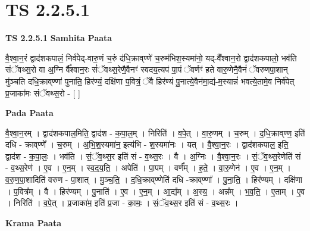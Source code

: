 \documentclass[17pt]{extarticle}
\begin{document}
\section*{ TS 2.2.5.1 }

\textbf{TS 2.2.5.1 } \newline
\textbf{Samhita Paata} \newline

वै॒श्वा॒न॒रं द्वाद॑शकपालं॒ निर्व॑पेद्-वारु॒णं च॒रुं द॑धि॒क्राव्‌ण्णे॑ च॒रुम॑भिश॒स्यमा॑नो॒ यद्-वै᳚श्वान॒रो द्वाद॑शकपालो॒ भव॑ति संॅवथ्स॒रो वा अ॒ग्नि र्वै᳚श्वान॒रः सं॑ॅवथ्स॒रेणै॒वैनꣳ॑ स्वदय॒त्यप॑ पा॒पं ॅवर्णꣳ॑ हते वारु॒णेनै॒वैनं॑ ॅवरुणपा॒शान् मु॑ञ्चति दधि॒क्राव्‌ण्णा॑ पुनाति॒ हिर॑ण्यं॒ दक्षि॑णा प॒वित्रं॒ ॅवै हिर॑ण्यं पु॒नात्ये॒वैन॑मा॒द्य॑-म॒स्यान्नं॑ भवत्ये॒तामे॒व निर्व॑पेत् प्र॒जाका॑मः संॅवथ्स॒रो - [  ] \newline

\textbf{Pada Paata} \newline

वै॒श्वा॒न॒रम् । द्वाद॑शकपाल॒मिति॒ द्वाद॑श - क॒पा॒ल॒म् । निरिति॑ । व॒पे॒त् । वा॒रु॒णम् । च॒रुम् । द॒धि॒क्राव्‌ण्ण॒ इति॑ दधि - क्राव्‌ण्णे᳚ । च॒रुम् । अ॒भि॒श॒स्यमा॑न॒ इत्य॑भि - श॒स्यमा॑नः । यत् । वै॒श्वा॒न॒रः । द्वाद॑शकपाल॒ इति॒ द्वाद॑श - क॒पा॒लः॒ । भव॑ति । सं॒ॅव॒थ्स॒र इति॑ सं - व॒थ्स॒रः । वै । अ॒ग्निः । वै॒श्वा॒न॒रः । सं॒ॅव॒थ्स॒रेणेति॑ सं - व॒थ्स॒रेण॑ । ए॒व । ए॒न॒म् । स्व॒द॒य॒ति॒ । अपेति॑ । पा॒पम् । वर्ण᳚म् । ह॒ते॒ । वा॒रु॒णेन॑ । ए॒व । ए॒न॒म् । व॒रु॒ण॒पा॒शादिति॑ वरुण - पा॒शात् । मु॒ञ्च॒ति॒ । द॒धि॒क्राव्‌ण्णेति॑ दधि -क्राव्‌ण्णा᳚ । पु॒ना॒ति॒ । हिर॑ण्यम् । दक्षि॑णा । प॒वित्र᳚म् । वै । हिर॑ण्यम् । पु॒नाति॑ । ए॒व । ए॒न॒म् । आ॒द्य᳚म् । अ॒स्य॒ । अन्न᳚म् । भ॒व॒ति॒ । ए॒ताम् । ए॒व । निरिति॑ । व॒पे॒त् । प्र॒जाका॑म॒ इति॑ प्र॒जा - का॒मः॒ । सं॒ॅव॒थ्स॒र इति॑ सं - व॒थ्स॒रः ।  \newline


\textbf{Krama Paata} \newline
\end{document}
